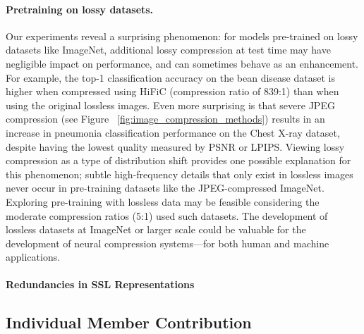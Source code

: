 \documentclass[10pt,twocolumn,letterpaper]{article}
\begin{document}
\paragraph{Pretraining on lossy datasets.} Our experiments reveal a surprising phenomenon: for models pre-trained on lossy datasets like ImageNet, additional lossy compression at test time may have negligible impact on performance, and can sometimes behave as an enhancement. For example, the top-1 classification accuracy on the bean disease dataset is higher when compressed using HiFiC (compression ratio of 839:1) than when using the original lossless images. Even more surprising is that severe JPEG compression (see Figure ~\ref{fig:image_compression_methods}) results in an increase in pneumonia classification performance on the Chest X-ray dataset, despite having the lowest quality measured by PSNR or LPIPS. Viewing lossy compression as a type of distribution shift provides one possible explanation for this phenomenon; subtle high-frequency details that only exist in lossless images never occur in pre-training datasets like the JPEG-compressed ImageNet. Exploring pre-training with lossless data may be feasible considering the moderate compression ratios (5:1) used such datasets. The development of lossless datasets at ImageNet or larger scale could be valuable for the development of neural compression systems---for both human and machine applications.  

\paragraph{Redundancies in SSL Representations}



\subsection{Individual Member Contribution}



{\small


}
\end{document}
